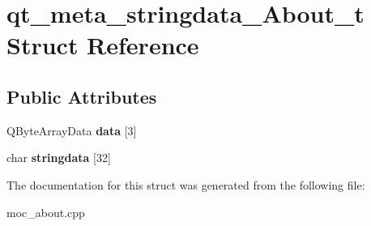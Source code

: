 \hypertarget{structqt__meta__stringdata__About__t}{\section{qt\-\_\-meta\-\_\-stringdata\-\_\-\-About\-\_\-t Struct Reference}
\label{structqt__meta__stringdata__About__t}
}
\subsection*{Public Attributes}
\begin{DoxyCompactItemize}
\item 
\hypertarget{structqt__meta__stringdata__About__t_aad871b20972058ad4ed0f071f3c4cdc2}{Q\-Byte\-Array\-Data {\bfseries data} \mbox{[}3\mbox{]}}\label{structqt__meta__stringdata__About__t_aad871b20972058ad4ed0f071f3c4cdc2}

\item 
\hypertarget{structqt__meta__stringdata__About__t_a5516a7089c28c3c85a299bf145958a14}{char {\bfseries stringdata} \mbox{[}32\mbox{]}}\label{structqt__meta__stringdata__About__t_a5516a7089c28c3c85a299bf145958a14}

\end{DoxyCompactItemize}


The documentation for this struct was generated from the following file\-:\begin{DoxyCompactItemize}
\item 
moc\-\_\-about.\-cpp\end{DoxyCompactItemize}

